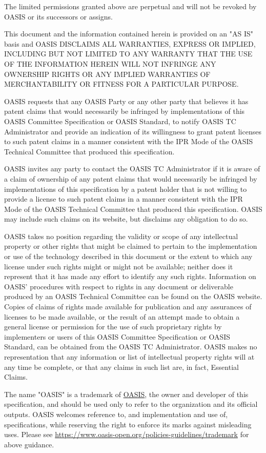 \begin{titlepage}
The limited permissions granted above are perpetual and will not be
revoked by OASIS or its successors or assigns.

This document and the information contained herein is provided on an
"AS IS" basis and OASIS DISCLAIMS ALL WARRANTIES, EXPRESS OR IMPLIED,
INCLUDING BUT NOT LIMITED TO ANY WARRANTY THAT THE USE OF THE
INFORMATION HEREIN WILL NOT INFRINGE ANY OWNERSHIP RIGHTS OR ANY
IMPLIED WARRANTIES OF MERCHANTABILITY OR FITNESS FOR A PARTICULAR
PURPOSE.

OASIS requests that any OASIS Party or any other party that believes
it has patent claims that would necessarily be infringed by
implementations of this OASIS Committee Specification or OASIS
Standard, to notify OASIS TC Administrator and provide an indication
of its willingness to grant patent licenses to such patent claims in a
manner consistent with the IPR Mode of the OASIS Technical Committee
that produced this specification.

OASIS invites any party to contact the OASIS TC Administrator if it is
aware of a claim of ownership of any patent claims that would
necessarily be infringed by implementations of this specification by a
patent holder that is not willing to provide a license to such patent
claims in a manner consistent with the IPR Mode of the OASIS Technical
Committee that produced this specification. OASIS may include such
claims on its website, but disclaims any obligation to do so.

OASIS takes no position regarding the validity or scope of any
intellectual property or other rights that might be claimed to pertain
to the implementation or use of the technology described in this
document or the extent to which any license under such rights might or
might not be available; neither does it represent that it has made any
effort to identify any such rights. Information on OASIS' procedures
with respect to rights in any document or deliverable produced by an
OASIS Technical Committee can be found on the OASIS website. Copies of
claims of rights made available for publication and any assurances of
licenses to be made available, or the result of an attempt made to
obtain a general license or permission for the use of such proprietary
rights by implementers or users of this OASIS Committee Specification
or OASIS Standard, can be obtained from the OASIS TC Administrator.
OASIS makes no representation that any information or list of
intellectual property rights will at any time be complete, or that any
claims in such list are, in fact, Essential Claims.

The name "OASIS" is a trademark of \href{https://www.oasis-open.org/}{OASIS}, the owner and developer of
this specification, and should be used only to refer to the
organization and its official outputs. OASIS welcomes reference to,
and implementation and use of, specifications, while reserving the
right to enforce its marks against misleading uses. Please see
\url{https://www.oasis-open.org/policies-guidelines/trademark} for above guidance.
\\\\

\end{titlepage}
